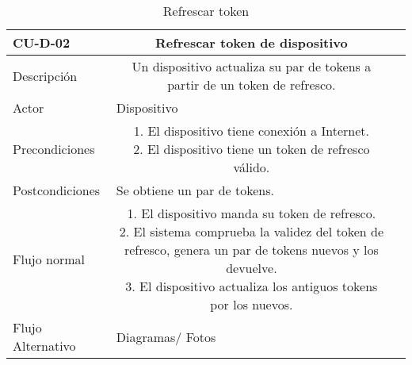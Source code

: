 \begin{table}[]
\centering
	\setlength{\extrarowheight}{3pt}
		\begin{tabular}{rc{1.85cm}|c{8cm}}
	    \hline
        \multicolumn{1}{|l}{ \textbf{CU-D-02}}     & \multicolumn{1}{c|}{\textbf{Refrescar token de dispositivo}  } \\
	    \hline \hline
	    \multicolumn{1}{|l}{Descripción}     & \multicolumn{1}{Y|}{
	    Un dispositivo actualiza su par de tokens a partir de un token de refresco.
	    }  \\ \cline{1-2}
	    \multicolumn{1}{|l}{Actor}           & \multicolumn{1}{l|}{Dispositivo}  \\ \cline{1-2}
	    \multicolumn{1}{|l}{Precondiciones}  & \multicolumn{1}{Y|}{
1. El dispositivo tiene conexión a Internet.\newline
2. El dispositivo tiene un token de refresco válido.}  \\ \cline{1-2}
	    \multicolumn{1}{|l}{Postcondiciones} & \multicolumn{1}{l|}{Se obtiene un par de tokens.}\\ \cline{1-2}
	    \multicolumn{1}{|l}{Flujo normal}    & \multicolumn{1}{Y|}{
1. El dispositivo manda su token de refresco. \newline
2. El sistema comprueba la validez del token de refresco, genera un par de tokens nuevos y los devuelve. \newline
3. El dispositivo actualiza los antiguos tokens por los nuevos.
	    } \\ \cline{1-2}
	    \multicolumn{1}{|l}{Flujo Alternativo} & \multicolumn{1}{l|}{Diagramas/ Fotos}\\ \cline{1-2}
	    \hline
	    \end{tabular}
	\label{table:cu-d-02}
	\caption{Refrescar token}
\end{table}

